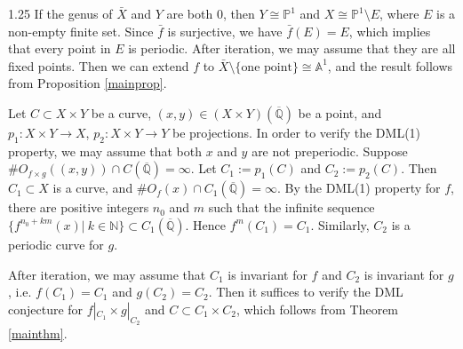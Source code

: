 \documentclass[12pt]{amsart}
\begin{document}
\begin{spacing}{1.25}
    If the genus of $\bar{X}$ and $Y$ are both $0$, then $Y\cong \mathbb{P}^1$ and $X\cong \mathbb{P}^1 \setminus E$, where $E$ is a non-empty finite set. Since $\bar{f}$ is surjective, we have $\bar{f}(E) = E$, which implies that every point in $E$ is periodic. After iteration, we may assume that they are all fixed points. Then we can extend $f$ to $\bar{X}\setminus \{ \text{one point}\} \cong \mathbb{A}^1$, and the result follows from Proposition \ref{mainprop}.
\endproof

    Let $C\subset X\times Y$ be a curve, $(x,y) \in (X\times Y)(\overline{\mathbb{Q}})$ be a point, and $p_1: X \times Y \to X$, $p_2: X \times Y \to Y$ be projections. In order to  verify the DML(1) property, we may assume that both $x$ and $y$ are not preperiodic. Suppose $\# O_{f\times g}((x,y))\cap C(\overline{\mathbb{Q}}) = \infty$.  Let $C_1:=p_1(C)$ and $C_2:=p_2(C)$. Then $C_1\subset X$ is a curve, and $\# O_f(x)\cap C_1(\overline{\mathbb{Q}}) = \infty$. By the DML(1) property for $f$, there are positive integers $n_0$ and $m$ such that the infinite sequence $\{f^{n_0+km}(x)|\ k\in \mathbb{N}\} \subset C_1(\overline{\mathbb{Q}})$. Hence $f^m(C_1)=C_1$. Similarly, $C_2$ is a periodic curve for $g$.

    After iteration, we may assume that $C_1$ is invariant for $f$ and $C_2$ is invariant for $g$, i.e. $f(C_1)=C_1$ and $g(C_2)=C_2$. Then it suffices to verify the DML conjecture for $f|_{C_1} \times g|_{C_2}$ and $C\subset C_1\times C_2$, which follows from Theorem \ref{mainthm}.  
\endproof













\end{spacing}
\end{document}
